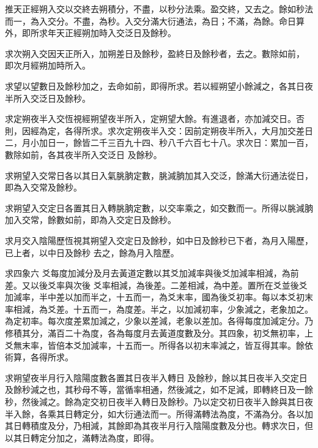 \begin{pinyinscope}
 推天正經朔入交以交終去朔積分，不盡，以秒分法乘。盈交終，又去之。餘如秒法而一，為入交分。不盡，為秒。入交分滿大衍通法，為日；不滿，為餘。命日算外，即所求年天正經朔加時入交泛日及餘秒。



 求次朔入交因天正所入，加朔差日及餘秒，盈終日及餘秒者，去之。數除如前，
 即次月經朔加時所入。



 求望以望數日及餘秒加之，去命如前，即得所求。若以經朔望小餘減之，各其日夜半所入交泛日及餘秒。



 求定朔夜半入交恆視經朔望夜半所入，定朔望大餘。有進退者，亦加減交日。否則，因經為定，各得所求。求次定朔夜半入交：因前定朔夜半所入，大月加交差日二，月小加日一，餘皆二千三百九十四、秒八千六百七十八。求次日：累加一百，數除如前，各其夜半所入交泛日
 及餘秒。



 求朔望入交常日各以其日入氣朓朒定數，朓減朒加其入交泛，餘滿大衍通法從日，即為入交常及餘秒。



 求朔望入交定日各置其日入轉朓朒定數，以交率乘之，如交數而一。所得以朓減朒加入交常，餘數如前，即為入交定日及餘秒。



 求月交入陰陽歷恆視其朔望入交定日及餘秒，如中日及餘秒已下者，為月入陽歷，已上者，以中日及餘秒
 去之，餘為月入陰歷。



 求四象六
 爻每度加減分及月去黃道定數以其爻加減率與後爻加減率相減，為前差。又以後爻率與次後
 爻率相減，為後差。二差相減，為中差。置所在爻並後爻加減率，半中差以加而半之，十五而一，為爻末率，國為後爻初率。每以本爻初末率相減，為爻差。十五而一，為度差。半之，以加減初率，少象減之，老象加之。為定初率。每次度差累加減之，少象以差減，老象以差加。各得每度加減定分。乃修積其分，滿百二十為度，各為每度月去黃道度數及分。其四象，初爻無初率，上爻無末率，皆倍本爻加減率，十五而一。所得各以初末率減之，皆互得其率。餘依術算，各得所求。



 求朔望夜半月行入陰陽度數各置其日夜半入轉日
 及餘秒，餘以其日夜半入交定日及餘秒減之也，其秒母不等，當循率相通，然後減之，如不足減，即轉終日及一餘秒，然後減之。餘為定交初日夜半入轉日及餘秒。乃以定交初日夜半入餘與其日夜半入餘，各乘其日轉定分，如大衍通法而一。所得滿轉法為度，不滿為分。各以加其日轉積度及分，乃相減，其餘即為其夜半月行入陰陽度數及分也。轉求次日，但以其日轉定分加之，滿轉法為度，即得。




\end{pinyinscope}
